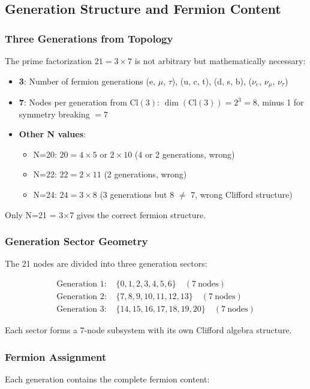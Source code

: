 \documentclass[12pt,a4paper]{article}
\begin{document}
\subsection{Generation Structure and Fermion Content}

\subsubsection{Three Generations from Topology}
The prime factorization $21 = 3 \times 7$ is not arbitrary but mathematically necessary:

\begin{itemize}
\item \textbf{3}: Number of fermion generations (e, $\mu$, $\tau$), (u, c, t), (d, s, b), ($\nu_e$, $\nu_\mu$, $\nu_\tau$)
\item \textbf{7}: Nodes per generation from $\mathrm{Cl}(3)$: $\dim(\mathrm{Cl}(3)) = 2^3 = 8$, minus 1 for symmetry breaking $= 7$
\item \textbf{Other N values}:
  \begin{itemize}
  \item N=20: $20 = 4\times5$ or $2\times10$ (4 or 2 generations, wrong)
  \item N=22: $22 = 2\times11$ (2 generations, wrong)
  \item N=24: $24 = 3\times8$ (3 generations but 8 $\neq$ 7, wrong Clifford structure)
  \end{itemize}
\end{itemize}

Only N=21 = 3$\times$7 gives the correct fermion structure.

\subsubsection{Generation Sector Geometry}
The 21 nodes are divided into three generation sectors:

\begin{align}
\text{Generation 1: } &\{0, 1, 2, 3, 4, 5, 6\} \quad (7\ \text{nodes}) \\
\text{Generation 2: } &\{7, 8, 9, 10, 11, 12, 13\} \quad (7\ \text{nodes}) \\
\text{Generation 3: } &\{14, 15, 16, 17, 18, 19, 20\} \quad (7\ \text{nodes})
\end{align}

Each sector forms a 7-node subsystem with its own Clifford algebra structure.

\subsubsection{Fermion Assignment}
Each generation contains the complete fermion content:
\end{document}
